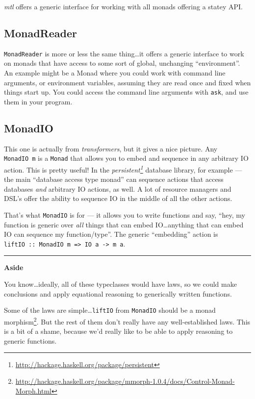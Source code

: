 \documentclass[]{article}
\renewcommand{\href}[2]{#2\footnote{\url{#1}}}
\begin{document}
\emph{mtl} offers a generic interface for working with all monads offering a
statey API.

\subsection{MonadReader}\label{monadreader}

\texttt{MonadReader} is more or less the same thing\ldots it offers a generic
interface to work on monads that have access to some sort of global, unchanging
``environment''. An example might be a Monad where you could work with command
line arguments, or environment variables, assuming they are read once and fixed
when things start up. You could access the command line arguments with
\texttt{ask}, and use them in your program.

\subsection{MonadIO}\label{monadio}

This one is actually from \emph{transformers}, but it gives a nice picture. Any
\texttt{MonadIO\ m} is a \texttt{Monad} that allows you to embed and sequence in
any arbitrary IO action. This is pretty useful! In the
\emph{\href{http://hackage.haskell.org/package/persistent}{persistent}} database
library, for example --- the main ``database access type monad'' can sequence
actions that access databases \emph{and} arbitrary IO actions, as well. A lot of
resource managers and DSL's offer the ability to sequence IO in the middle of
all the other actions.

That's what \texttt{MonadIO} is for --- it allows you to write functions and
say, ``hey, my function is generic over \emph{all} things that can embed
IO\ldots anything that can embed IO can sequence my function/type''. The generic
``embedding'' action is
\texttt{liftIO\ ::\ MonadIO\ m\ =\textgreater{}\ IO\ a\ -\textgreater{}\ m\ a}.

\begin{center}\rule{0.5\linewidth}{0.5pt}\end{center}

\textbf{Aside}

You know\ldots ideally, all of these typeclasses would have laws, so we could
make conclusions and apply equational reasoning to generically written
functions.

Some of the laws are simple\ldots{}\texttt{liftIO} from \texttt{MonadIO} should
be a
\href{http://hackage.haskell.org/package/mmorph-1.0.4/docs/Control-Monad-Morph.html}{monad
morphism}. But the rest of them don't really have any well-established laws.
This is a bit of a shame, because we'd really like to be able to apply reasoning
to generic functions.
\end{document}
